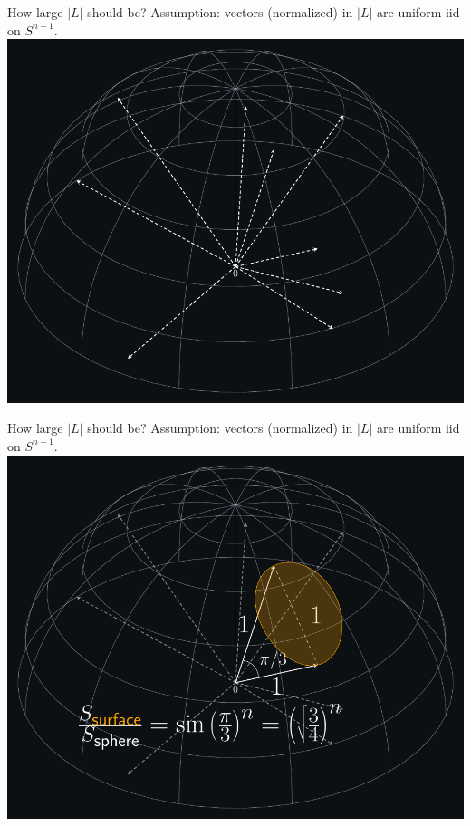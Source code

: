 \documentclass[usenames,dvipsnames, 9pt, aspectratio=169]{beamer}
\begin{document}
\begin{frame}{How large $|L|$ should be?}
	\pause
	Assumption: vectors (normalized) in $|L|$ are uniform iid on $S^{n-1}$. \\
	
	\includegraphics[width=\textwidth]{semi-sphere1}
\end{frame}
\begin{frame}{How large $|L|$ should be?}
Assumption: vectors (normalized) in $|L|$ are uniform iid on $S^{n-1}$. \\

\includegraphics[width=\textwidth]{semi-sphere2}
\end{frame}
\end{document}
